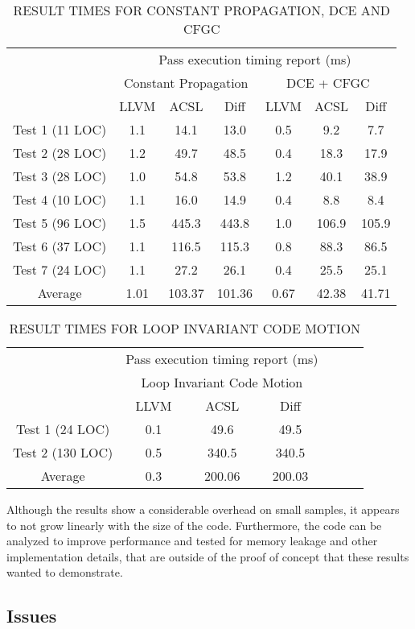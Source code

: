 \begin{table}[t]
\centering
\begin{tabular}{|c|c|c|c|c|c|c|}
\hline
\multirow{3}{*}{} & \multicolumn{6}{c|}{Pass execution timing report (ms)} \tabularnewline
\cline{2-7}
 & \multicolumn{3}{c|}{Constant Propagation} & \multicolumn{3}{c|}{DCE + CFGC}\tabularnewline
\cline{2-7}
 & LLVM & ACSL & Diff & LLVM & ACSL & Diff\tabularnewline
\hline
\hline
Test 1 (11 LOC) & 1.1 & 14.1 & 13.0 & 0.5 & 9.2 & 7.7 \tabularnewline
\hline
Test 2 (28 LOC) & 1.2 & 49.7 & 48.5 & 0.4 & 18.3 & 17.9 \tabularnewline
\hline
Test 3 (28 LOC) & 1.0 & 54.8 & 53.8 & 1.2 & 40.1 & 38.9 \tabularnewline
\hline
Test 4 (10 LOC) & 1.1 & 16.0 & 14.9 & 0.4 & 8.8 & 8.4 \tabularnewline
\hline
Test 5 (96 LOC) & 1.5 & 445.3 & 443.8 & 1.0 & 106.9 & 105.9 \tabularnewline
\hline
Test 6 (37 LOC) & 1.1 & 116.5 & 115.3 & 0.8 & 88.3 & 86.5 \tabularnewline
\hline
Test 7 (24 LOC) & 1.1 & 27.2 & 26.1 & 0.4 & 25.5 & 25.1 \tabularnewline
\hline
Average & 1.01 & 103.37 & 101.36 & 0.67 & 42.38 & 41.71 \tabularnewline
\hline
\end{tabular}

\caption{RESULT TIMES FOR CONSTANT PROPAGATION, DCE AND CFGC}
\label{tab:res1}
\end{table}

\begin{table}[t]
\centering
\begin{tabular}{|c|c|c|c|c|c|c|}
\hline
\multirow{3}{*}{} & \multicolumn{3}{c|}{Pass execution timing report (ms)} \tabularnewline
\cline{2-4}
 & \multicolumn{3}{c|}{Loop Invariant Code Motion} \tabularnewline
\cline{2-4}
 & LLVM & ACSL & Diff\tabularnewline
\hline
\hline
Test 1 (24 LOC) & 0.1 & 49.6 & 49.5 \tabularnewline
\hline
Test 2 (130 LOC) & 0.5 & 340.5 & 340.5 \tabularnewline
\hline
Average & 0.3 & 200.06 & 200.03 \tabularnewline
\hline
\end{tabular}

\caption{RESULT TIMES FOR LOOP INVARIANT CODE MOTION}
\label{tab:res2}
\end{table}

Although the results show a considerable overhead on small samples, it appears to not grow linearly with the size of the code. Furthermore, the code can be analyzed to improve performance and tested for memory leakage and other implementation details, that are outside of the proof of concept that these results wanted to demonstrate.

\subsection{Issues}
\label{sub:issues}

